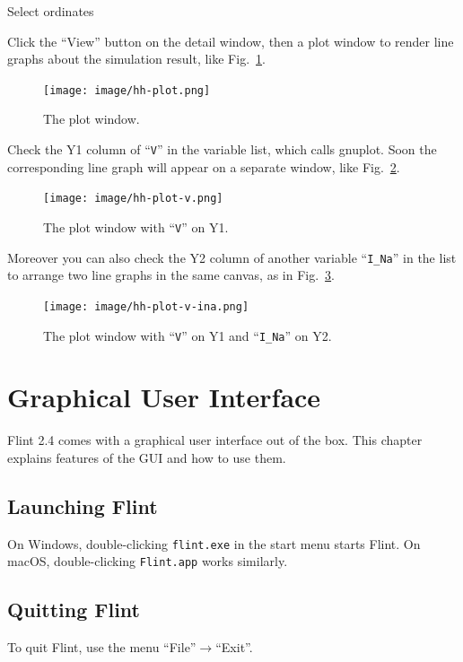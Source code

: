 \documentclass[a4paper,10pt]{report}
\begin{document}
\begin{description}
\item[{Select ordinates}] 
\end{description}
Click the ``View'' button on the detail window, then a plot window to render
line graphs about the simulation result, like Fig.~\ref{fig:orgb3f50f5}.

\begin{figure}[htbp]
\centering
\texttt{[image: image/hh-plot.png]}
\caption{\label{fig:orgb3f50f5}The plot window.}
\end{figure}

Check the Y1 column of ``\texttt{V}'' in the variable list, which calls gnuplot.
Soon the corresponding line graph will appear on a separate window,
like Fig.~\ref{fig:org4385318}.

\begin{figure}[htbp]
\centering
\texttt{[image: image/hh-plot-v.png]}
\caption{\label{fig:org4385318}The plot window with ``\texttt{V}'' on Y1.}
\end{figure}

Moreover you can also check the Y2 column of another variable ``\texttt{I\_Na}'' in the
list to arrange two line graphs in the same canvas, as in
Fig.~\ref{fig:org1f1bc40}.

\begin{figure}[htbp]
\centering
\texttt{[image: image/hh-plot-v-ina.png]}
\caption{\label{fig:org1f1bc40}The plot window with ``\texttt{V}'' on Y1 and ``\texttt{I\_Na}'' on Y2.}
\end{figure}

\chapter{Graphical User Interface}
\label{sec:org9a03d40}
Flint 2.4 comes with a graphical user interface out of the box. This chapter
explains features of the GUI and how to use them.

\section{Launching Flint}
\label{sec:orgacd58a4}
On Windows, double-clicking \texttt{flint.exe} in the start menu starts Flint.
On macOS, double-clicking \texttt{Flint.app} works similarly.

\section{Quitting Flint}
\label{sec:orga11008b}
To quit Flint, use the menu ``File''\(\to\)``Exit''.
\end{document}
